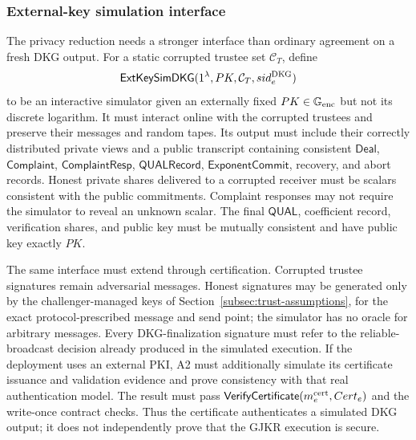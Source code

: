 \documentclass[pdflatex,sn-mathphys-num]{sn-jnl}%
\theoremstyle{thmstyleone}%
\theoremstyle{thmstyletwo}%
\theoremstyle{thmstylethree}%
\begin{document}
\subsubsection{External-key simulation interface}
\label{subsec:extkey-dkg-interface}

The privacy reduction needs a stronger interface than ordinary agreement on a
fresh DKG output.  For a static corrupted trustee set $\mathcal C_T$, define
\[
 \mathsf{ExtKeySimDKG}(1^\lambda,PK,\mathcal C_T,sid_e^{\rm DKG})
\]
to be an interactive simulator given an externally fixed $PK\in\mathbb
G_{\rm enc}$ but not its discrete logarithm.  It must interact online with the
corrupted trustees and preserve their messages and random tapes.  Its output
must include their correctly distributed private views and a public transcript
containing consistent $\mathsf{Deal}$, $\mathsf{Complaint}$,
$\mathsf{ComplaintResp}$, $\mathsf{QUALRecord}$,
$\mathsf{ExponentCommit}$, recovery, and abort records.  Honest private shares
delivered to a corrupted receiver must be scalars consistent with the public
commitments.  Complaint responses may not require the simulator to reveal an
unknown scalar.  The final $\mathsf{QUAL}$, coefficient record, verification
shares, and public key must be mutually consistent and have public key exactly
$PK$.

The same interface must extend through certification.  Corrupted trustee
signatures remain adversarial messages.  Honest signatures may be generated
only by the challenger-managed keys of Section~\ref{subsec:trust-assumptions},
for the exact protocol-prescribed message and send point; the simulator has no
oracle for arbitrary messages.  Every DKG-finalization signature must refer to
the reliable-broadcast decision already produced in the simulated execution.
If the deployment uses an external PKI, A2 must additionally simulate its
certificate issuance and validation evidence and prove consistency with that
real authentication model.  The result must pass
$\mathsf{VerifyCertificate}(m_e^{\rm cert},Cert_e)$ and the write-once contract
checks.  Thus the certificate authenticates a simulated DKG output; it does
not independently prove that the GJKR execution is secure.
\end{document}
